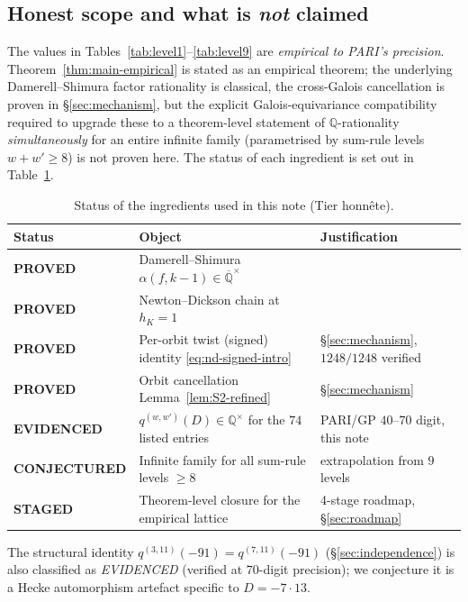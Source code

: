 \documentclass[11pt,a4paper]{amsart}
\theoremstyle{plain}
\theoremstyle{definition}
\newcommand{\Q}{\mathbb{Q}}
\newcommand{\qstr}[2]{q^{(#1,#2)}}
\begin{document}
\subsection{Honest scope and what is \emph{not} claimed}

The values in Tables~\ref{tab:level1}--\ref{tab:level9} are
\emph{empirical to PARI's precision}. Theorem~\ref{thm:main-empirical} is
stated as an empirical theorem; the underlying Damerell--Shimura factor
rationality is classical, the cross-Galois cancellation is proven in
\S\ref{sec:mechanism}, but the explicit Galois-equivariance compatibility
required to upgrade these to a theorem-level statement of $\Q$-rationality
\emph{simultaneously} for an entire infinite family
(parametrised by sum-rule levels $w + w' \ge 8$) is not proven here.
The status of each ingredient is set out in
Table~\ref{tab:status-tiers}.

\begin{table}[h]
\centering
\caption{Status of the ingredients used in this note (Tier honnête).}
\label{tab:status-tiers}
\begin{tabular}{lp{6.0cm}p{4.6cm}}
\toprule
Status & Object & Justification\\
\midrule
\textbf{PROVED} & Damerell--Shimura
$\alpha(f, k-1)\in\overline{\Q}^{\times}$
 & \cite{Damerell1971a,Shimura1976}\\
\textbf{PROVED} & Newton--Dickson chain at $h_K = 1$
 & \cite{Remondiere2026ND}\\
\textbf{PROVED} & Per-orbit twist (signed) identity
\eqref{eq:nd-signed-intro} & \S\ref{sec:mechanism},
$1248/1248$ verified\\
\textbf{PROVED} & Orbit cancellation
Lemma~\ref{lem:S2-refined} & \S\ref{sec:mechanism}\\
\textbf{EVIDENCED} & $\qstr{w}{w'}(D)\in\Q^{\times}$ for the $74$
listed entries & PARI/GP $40$--$70$ digit, this note\\
\textbf{CONJECTURED} & Infinite family for all sum-rule
levels $\ge 8$ & extrapolation from $9$ levels\\
\textbf{STAGED} & Theorem-level closure for the empirical
lattice & 4-stage roadmap, \S\ref{sec:roadmap}\\
\bottomrule
\end{tabular}
\end{table}

The structural identity $\qstr{3}{11}(-91) = \qstr{7}{11}(-91)$
(\S\ref{sec:independence}) is also classified as
\emph{EVIDENCED} (verified at $70$-digit precision); we conjecture it is a
Hecke automorphism artefact specific to $D = -7\cdot 13$.
\end{document}
